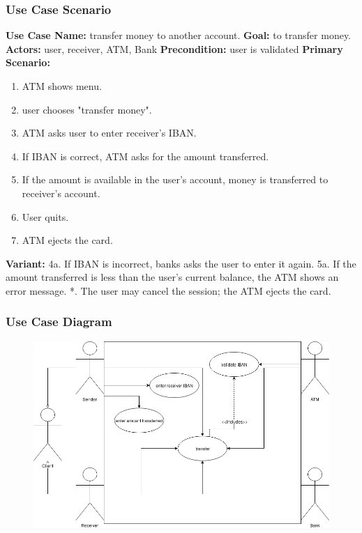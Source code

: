 \documentclass{article}
\begin{document}
		\subsubsection{Use Case Scenario}
		\textbf{Use Case Name:}	transfer money to another account.
		\newline\textbf{Goal:} to transfer money.
		\newline\textbf{Actors:} user, receiver, ATM, Bank 	
		\newline\textbf{Precondition:} user is validated 	
		\newline\textbf{Primary Scenario:}	
			\begin{enumerate}[label*=\arabic*.]
				\item ATM shows menu.
				\item user chooses "transfer money".
				\item ATM asks user to enter receiver's IBAN.
				\item If IBAN is correct, ATM asks for the amount transferred.
				\item If the amount is available in the user's account, money is transferred to receiver's account.
				\item User quits.
				\item ATM ejects the card.
			\end{enumerate}
		\textbf{Variant:}\newline	
			\hspace*{5mm}4a. If IBAN is incorrect, banks asks the user to enter it again.\newline
			\hspace*{5mm}5a. If the amount transferred is less than the user's current balance, the ATM shows an error message.\newline
			\hspace*{5mm}*. The user may cancel the session; the ATM ejects the card.

		\newpage\subsubsection{Use Case Diagram}
			\begin{figure}[h!]
			  \includegraphics[width=\linewidth]{img/transfer_usecase.png}
			\end{figure}
\end{document}

